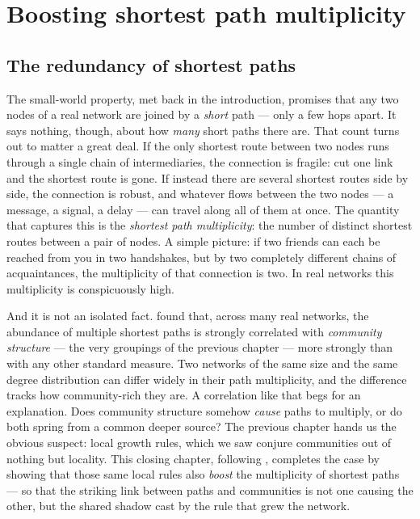 \chapter{Boosting shortest path multiplicity}
\label{ch:distance}

\section{The redundancy of shortest paths}

The small-world property, met back in the introduction, promises that any two
nodes of a real network are joined by a \emph{short} path --- only a few hops
apart. It says nothing, though, about how \emph{many} short paths there are.
That count turns out to matter a great deal. If the only shortest route between
two nodes runs through a single chain of intermediaries, the connection is
fragile: cut one link and the shortest route is gone. If instead there are
several shortest routes side by side, the connection is robust, and whatever
flows between the two nodes --- a message, a signal, a delay --- can travel along
all of them at once. The quantity that captures this is the \emph{shortest path
multiplicity}: the number of distinct shortest routes between a pair of nodes. A
simple picture: if two friends can each be reached from you in two handshakes,
but by two completely different chains of acquaintances, the multiplicity of that
connection is two. In real networks this multiplicity is conspicuously high.

And it is not an isolated fact. \citet{deng2026} found that, across many real
networks, the abundance of multiple shortest paths is strongly correlated with
\emph{community structure} --- the very groupings of the previous chapter --- more
strongly than with any other standard measure. Two networks of the same size and
the same degree distribution can differ widely in their path multiplicity, and
the difference tracks how community-rich they are. A correlation like that begs
for an explanation. Does community structure somehow \emph{cause} paths to
multiply, or do both spring from a common deeper source? The previous chapter
hands us the obvious suspect: local growth rules, which we saw conjure
communities out of nothing but locality. This closing chapter, following
\citet{vazquezpaths2026}, completes the case by showing that those same local
rules also \emph{boost} the multiplicity of shortest paths --- so that the
striking link between paths and communities is not one causing the other, but the
shared shadow cast by the rule that grew the network.

